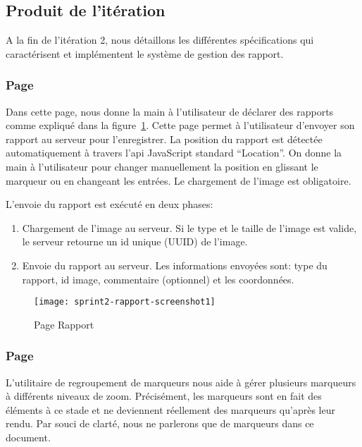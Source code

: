\subsection{Produit de l'itération}

A la fin de l'itération 2, nous détaillons les différentes spécifications qui
caractérisent et implémentent le système de gestion des rapport.

\subsubsection{Page }

Dans cette page, nous donne la main à l'utilisateur de déclarer des rapports
comme expliqué dans la figure~\ref{fig:sprint2-rapport-screenshot1}. Cette page
permet à l'utilisateur d'envoyer son rapport au serveur pour l'enregistrer. La
position du rapport est détectée automatiquement à travers l'api JavaScript
standard ``Location''. On donne la main à l'utilisateur pour changer
manuellement la position en glissant le marqueur ou en changeant les entrées.
Le chargement de l'image est obligatoire.

L'envoie du rapport est exécuté en deux phases:

\begin{enumerate}
    \item Chargement de l'image au serveur. Si le type et le taille de l'image
        est valide, le serveur retourne un id unique (UUID) de l'image.
    \item Envoie du rapport au serveur. Les informations envoyées sont: type du
        rapport, id image, commentaire (optionnel) et les coordonnées.
\end{enumerate}

\begin{figure}[H]
    \centering
    \texttt{[image: sprint2-rapport-screenshot1]}
    \caption{Page Rapport}
\label{fig:sprint2-rapport-screenshot1}
\end{figure}

\subsubsection{Page }

L'utilitaire de regroupement de marqueurs nous aide à gérer plusieurs marqueurs
à différents niveaux de zoom. Précisément, les marqueurs sont en fait des
éléments à ce stade et ne deviennent réellement des marqueurs qu'après leur
rendu. Par souci de clarté, nous ne parlerons que de marqueurs dans ce
document.

